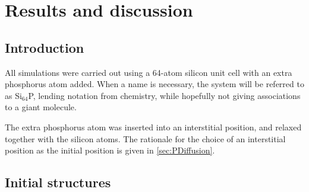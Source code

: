 \documentclass[11pt,bibliography=totoc,index=totoc]{scrbook}   %
\begin{document}



%
\chapter{Results and discussion}\label{cha:results} %
%

%
\section{Introduction}\label{sec:resultsIntro}
%

All simulations were carried out using a 64-atom silicon unit cell with an extra phosphorus atom added. 
When a name is necessary, the system will be referred to as Si$_{64}$P, lending notation from chemistry, while hopefully not giving associations to a giant molecule.

The extra phosphorus atom was inserted into an interstitial position, and relaxed together with the silicon atoms.
The rationale for the choice of an interstitial position as the initial position is given in \ref{sec:PDiffusion}.


%
\section{Initial structures}\label{sec:structures}
%
\end{document}
